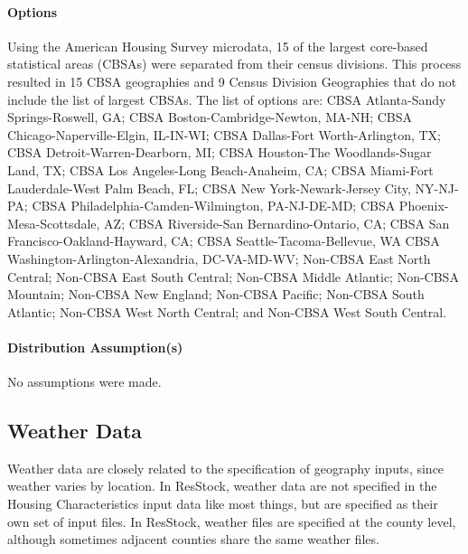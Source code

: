 \paragraph{Options}
Using the American Housing Survey microdata, 15 of the largest core-based statistical areas (CBSAs) were separated from their census divisions. This process resulted in 15 CBSA geographies and 9 Census Division Geographies that do not include the list of largest CBSAs. The list of options are: CBSA Atlanta-Sandy Springs-Roswell, GA; CBSA Boston-Cambridge-Newton, MA-NH; CBSA Chicago-Naperville-Elgin, IL-IN-WI; CBSA Dallas-Fort Worth-Arlington, TX; CBSA Detroit-Warren-Dearborn, MI; CBSA Houston-The Woodlands-Sugar Land, TX; CBSA Los Angeles-Long Beach-Anaheim, CA; CBSA Miami-Fort Lauderdale-West Palm Beach, FL; CBSA New York-Newark-Jersey City, NY-NJ-PA; CBSA Philadelphia-Camden-Wilmington, PA-NJ-DE-MD; CBSA Phoenix-Mesa-Scottsdale, AZ; CBSA Riverside-San Bernardino-Ontario, CA; CBSA San Francisco-Oakland-Hayward, CA; CBSA Seattle-Tacoma-Bellevue, WA
CBSA Washington-Arlington-Alexandria, DC-VA-MD-WV; Non-CBSA East North Central; Non-CBSA East South Central; Non-CBSA Middle Atlantic; Non-CBSA Mountain; Non-CBSA New England; Non-CBSA Pacific; Non-CBSA South Atlantic; Non-CBSA West North Central; and Non-CBSA West South Central.

\paragraph{Distribution Assumption(s)}
No assumptions were made.

\subsection{Weather Data}
Weather data are closely related to the specification of geography inputs, since weather varies by location. In ResStock, weather data are not specified in the Housing Characteristics input data like most things, but are specified as their own set of input files. In ResStock, weather files are specified at the county level, although sometimes adjacent counties share the same weather files.

